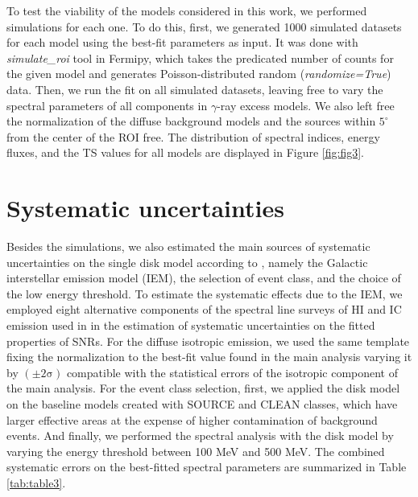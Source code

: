 \documentclass[fleqn,usenatbib]{mnras}
\begin{document}
To test the viability of the models considered in this work, we performed simulations for each one. To do this, first, we generated 1000 simulated datasets for each model using the best-fit parameters as input. It was done with \textit{simulate\_roi} tool in Fermipy, which takes the predicated number of counts for the given model and generates Poisson-distributed random (\textit{randomize=True}) data. Then, we run the fit on all simulated datasets, leaving free to vary the spectral parameters of all components in $\gamma$-ray excess models. We also left free the normalization of the diffuse background models and the sources within $5^{\circ}$ from the center of the ROI free. The distribution of spectral indices, energy fluxes, and the TS values for all models are displayed in Figure \ref{fig:fig3}.

\section{Systematic uncertainties}

Besides the simulations, we also estimated the main sources of systematic uncertainties on the single disk model according to \citep{fermicoma2018PhRvD..98f3006X}, namely the Galactic interstellar emission model (IEM), the selection of event class, and the choice of the low energy threshold. To estimate the systematic effects due to the IEM, we employed eight alternative components of the spectral line surveys of HI and IC emission used in \citet{2016ApJS..224....8A} in the estimation of systematic uncertainties on the fitted properties of SNRs. For the diffuse isotropic emission, we used the same template fixing the normalization to the best-fit value found in the main analysis varying it by $\mathrm{(\pm2\sigma)}$ compatible with the statistical errors of the isotropic component of the main analysis. For the event class selection, first, we applied the disk model on the baseline models created with SOURCE and CLEAN classes, which have larger effective areas at the expense of higher contamination of background events. And finally, we performed the spectral analysis with the disk model by varying the energy threshold between 100 MeV and 500 MeV. The combined systematic errors on the best-fitted spectral parameters are summarized in Table \ref{tab:table3}.





\label{lastpage}
\end{document}

